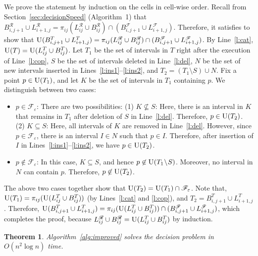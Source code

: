 \documentclass[12pt]{dalthesis}
\def\favoritefont{\bfseries \sffamily}
\def\QED{\ensuremath{{\Box}}}
\def\markatright#1{\leavevmode\unskip\nobreak\quad\hspace*{\fill}{#1}}
\newenvironment{proof}
	{\begin{trivlist}\item[\hskip\labelsep{\favoritefont Proof:}]}
	{\markatright{\QED}\end{trivlist}}
\newtheorem{theorem}{Theorem}
\newcommand{\eps}{\varepsilon}
\newcommand{\bslash}{\!\setminus\!}
\newcommand{\CF}{{\mathscr F}}
\newcommand{\CR}{{\mathscr R}}
\newcommand{\Feps}{\CF_\eps}
\newcommand{\LF}{L^\CF}
\newcommand{\BF}{B^\CF}
\newcommand{\LR}{L^\CR}
\newcommand{\BR}{B^\CR}
\newcommand{\LT}{L^{T}}
\newcommand{\BT}{B^{T}}
\newcommand{\proj}[1]{\pi_{#1}}
\newcommand{\union}{\mbox{\sc U}}
\begin{document}
\begin{proof}
	We prove the statement by induction on the cells in cell-wise order.
	Recall from Section~\ref{sec:decisionSpeed} (Algorithm~1) 
	that $\BR_{i,j+1} \cup \LR_{i+1,j} = \proj{ij}(\LR_{ij} \cup \BR_{ij}) \cap (\BF_{i,j+1} \cup \LF_{i+1,j})$.
	Therefore, it satisfies to show that 
	$\union(\BT_{i,j+1} \cup \LT_{i+1,j}) = \proj{ij}(\LR_{ij} \cup \BR_{ij}) \cap (\BF_{i,j+1} \cup \LF_{i+1,j})$.
	By Line~\ref{l:cat}, $\union(T) = \union(\LT_{ij} \cup \BT_{ij})$.
	Let $T_1$ be the set of intervals in $T$ right after the execution of Line~\ref{l:cop},
	$S$ be the set of intervals deleted in Line~\ref{l:del},
	$N$ be the set of new intervals inserted in Lines~\ref{l:ins1}--\ref{l:ins2},
	and $T_2 = (T_1 \bslash S) \cup N$.
	Fix a point $p \in \union(T_1)$, and let $K$ be the set of intervals in $T_1$ containing $p$.
	We distinguish between two cases: 
	\begin{itemize}
		\item $p \in \Feps$: There are two possibilities:	
		(1) $K \not\subseteq S$:
			Here, there is an interval in $K$ that remains in $T_1$ after
			deletion of $S$ in Line~\ref{l:del}. 
			Therefore, $p \in \union(T_2)$.
		(2) $K \subseteq S$:
			Here, all intervals of $K$ are removed in Line~\ref{l:del}.
			However, since $p \in \Feps$, there is an interval $I \in N$ such that $p \in I$.
			Therefore, after insertion of $I$ in Lines~\ref{l:ins1}--\ref{l:ins2}, we have
			$p \in \union(T_2)$.

		\item  $p \not\in \Feps$: 
		In this case, $K \subseteq S$,
		and hence $p \not\in \union(T_1 \bslash S)$. 
		Moreover, no interval in $N$ can contain $p$.
		Therefore, $p \not\in \union(T_2)$.
	\end{itemize}
	The above two cases together show that $\union(T_2) = \union(T_1) \cap \Feps$.
	Note that, $\union(T_1) = \proj{ij}(\union(\LT_{ij} \cup \BT_{ij}))$ (by Lines~\ref{l:cat} and \ref{l:cop}),
	and $T_2 = \BT_{i,j+1} \cup \LT_{i+1,j}$.
	Therefore, $\union(\BT_{i,j+1} \cup \LT_{i+1,j}) = \proj{ij}(\union(\LT_{ij} \cup \BT_{ij})) 
	 \cap (\BF_{i,j+1} \cup \LF_{i+1,j})$,
	which completes the proof, because $\LR_{ij} \cup \BR_{ij} = \union(\LT_{ij} \cup \BT_{ij})$
	by induction.
\end{proof}


\begin{theorem}
	Algorithm~\ref{alg:improved} solves the decision problem in $O(n^2 \log n)$ time.
\end{theorem}
\end{document}
